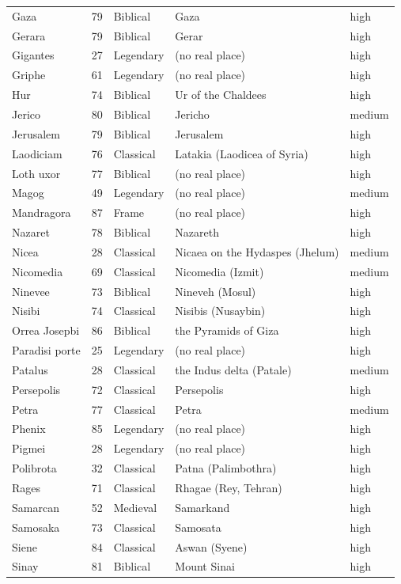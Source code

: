 \documentclass[11pt,a4paper]{article}
\begin{document}
{\begin{longtable}{p{3.2cm}rlp{6.6cm}l}
Gaza & 79 & Biblical & Gaza & high\\
Gerara & 79 & Biblical & Gerar & high\\
Gigantes & 27 & Legendary & (no real place) & high\\
Griphe & 61 & Legendary & (no real place) & high\\
Hur & 74 & Biblical & Ur of the Chaldees & high\\
Jerico & 80 & Biblical & Jericho & medium\\
Jerusalem & 79 & Biblical & Jerusalem & high\\
Laodiciam & 76 & Classical & Latakia (Laodicea of Syria) & high\\
Loth uxor & 77 & Biblical & (no real place) & high\\
Magog & 49 & Legendary & (no real place) & medium\\
Mandragora & 87 & Frame & (no real place) & high\\
Nazaret & 78 & Biblical & Nazareth & high\\
Nicea & 28 & Classical & Nicaea on the Hydaspes (Jhelum) & medium\\
Nicomedia & 69 & Classical & Nicomedia (Izmit) & medium\\
Ninevee & 73 & Biblical & Nineveh (Mosul) & high\\
Nisibi & 74 & Classical & Nisibis (Nusaybin) & high\\
Orrea Josepbi & 86 & Biblical & the Pyramids of Giza & high\\
Paradisi porte & 25 & Legendary & (no real place) & high\\
Patalus & 28 & Classical & the Indus delta (Patale) & medium\\
Persepolis & 72 & Classical & Persepolis & high\\
Petra & 77 & Classical & Petra & medium\\
Phenix & 85 & Legendary & (no real place) & high\\
Pigmei & 28 & Legendary & (no real place) & high\\
Polibrota & 32 & Classical & Patna (Palimbothra) & high\\
Rages & 71 & Classical & Rhagae (Rey, Tehran) & high\\
Samarcan & 52 & Medieval & Samarkand & high\\
Samosaka & 73 & Classical & Samosata & high\\
Siene & 84 & Classical & Aswan (Syene) & high\\
Sinay & 81 & Biblical & Mount Sinai & high\\

\end{longtable}}
\end{document}
